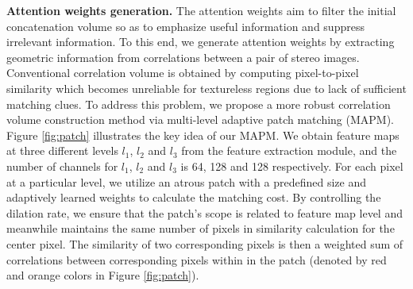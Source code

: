 \documentclass[10pt,twocolumn,letterpaper]{article}
\begin{document}
\textbf{Attention weights generation.} \label{sec:att_weighs} The attention weights aim to filter the initial concatenation volume so as to emphasize useful information and suppress irrelevant information. To this end, we generate attention weights by extracting geometric information from correlations between a pair of stereo images. Conventional correlation volume is obtained by computing pixel-to-pixel similarity which becomes unreliable for textureless regions due to lack of sufficient matching clues. To address this problem, we propose a more robust correlation volume construction method via multi-level adaptive patch matching (MAPM). Figure \ref{fig:patch} illustrates the key idea of our MAPM. We obtain feature maps at three different levels $l_1$, $l_2$ and $l_3$ from the feature extraction module, and the number of channels for $l_1$, $l_2$ and $l_3$ is 64, 128 and 128 respectively. For each pixel at a particular level, we utilize an atrous patch with a predefined size and adaptively learned weights to calculate the matching cost. By controlling the dilation rate, we ensure that the patch’s scope is related to feature map level and meanwhile maintains the same number of pixels in similarity calculation for the center pixel. The similarity of two corresponding pixels is then a weighted sum of correlations between corresponding pixels within in the patch (denoted by red and orange colors in Figure \ref{fig:patch}).
\end{document}
